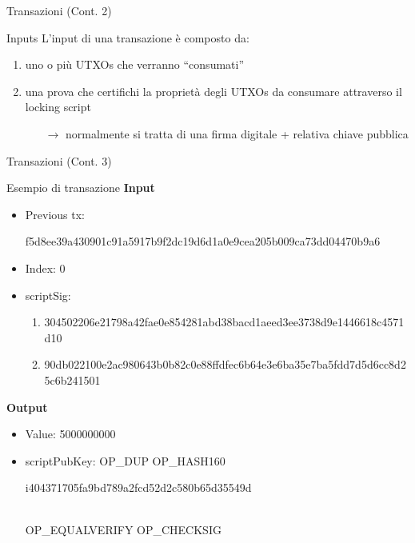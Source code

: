 \documentclass{beamer}
\begin{document}
  \begin{frame}{Transazioni (Cont. 2)}
    \begin{block}{Inputs}
      L'input di una transazione è composto da: 
      \begin{enumerate}
        \item uno o più UTXOs che verranno ``consumati''
        \item una prova che certifichi la proprietà degli UTXOs da consumare attraverso il locking script 
        \begin{itemize}
          \item[$\rightarrow$] normalmente si tratta di una firma digitale + relativa chiave pubblica 
        \end{itemize}
      \end{enumerate}
    \end{block}
  \end{frame}
  
  
  
  
  \begin{frame}{Transazioni (Cont. 3)}
    \begin{block}{Esempio di transazione}
        \textbf{Input}\\
        \begin{itemize}
            \item Previous tx: \begin{tiny}f5d8ee39a430901c91a5917b9f2dc19d6d1a0e9cea205b009ca73dd04470b9a6\end{tiny}
            \item Index: 0
            \item scriptSig: 
            \begin{enumerate}
                \item \begin{tiny}304502206e21798a42fae0e854281abd38bacd1aeed3ee3738d9e1446618c4571d10\end{tiny}
                \item \begin{tiny}90db022100e2ac980643b0b82c0e88ffdfec6b64e3e6ba35e7ba5fdd7d5d6cc8d25c6b241501\end{tiny}
            \end{enumerate}
        \end{itemize}

        \textbf{Output}\\
        \begin{itemize}
            \item Value: 5000000000
            \item scriptPubKey: OP\_DUP OP\_HASH160 \begin{tiny}i404371705fa9bd789a2fcd52d2c580b65d35549d\end{tiny}\\ OP\_EQUALVERIFY OP\_CHECKSIG
        \end{itemize}
    \end{block}
  \end{frame}
  
\end{document}
